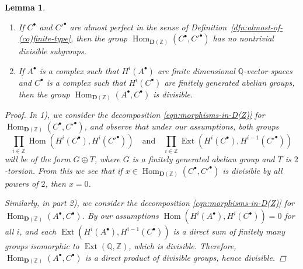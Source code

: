 \documentclass[leqno,12pt]{article}
\theoremstyle{plain}
\newtheorem{lemma}[theorem]{\indent\sc Lemma}
\theoremstyle{definition}
\DeclareMathOperator{\Hom}{Hom}
\DeclareMathOperator{\Ext}{Ext}
\newcommand{\QQ}{\mathbb{Q}}
\newcommand{\ZZ}{\mathbb{Z}}
\newcommand{\DZ}{{\mathbf{D} (\ZZ)}}
\begin{document}
\begin{lemma}
  \label{lemma:morphisms-inDAb-not-divisible}
  ~

  \begin{enumerate}
  \item[$1)$] If $C^\bullet$ and $C'^\bullet$ are almost perfect in the sense of
    Definition~{\rm\ref{dfn:almost-of-(co)finite-type}}, then the group
    $\Hom_\DZ (C^\bullet, C'^\bullet)$ has no nontrivial
    divisible subgroups.

  \item[$2)$] If $A^\bullet$ is a complex such that $H^i (A^\bullet)$ are finite
    dimensional $\QQ$-vector spaces and $C^\bullet$ is a complex such that
    $H^i (C^\bullet)$ are finitely generated abelian groups, then the group
    $\Hom_\DZ (A^\bullet, C^\bullet)$ is divisible.
  \end{enumerate}

  \begin{proof}
    In 1), we consider the decomposition \eqref{eqn:morphisms-in-D(Z)} for
    $\Hom_\DZ (C^\bullet, C'^\bullet)$, and observe that under
    our assumptions, both groups
    \[ \prod_{i\in\ZZ} \Hom (H^i (C^\bullet), H^i (C'^\bullet))
      \quad\text{and}\quad
      \prod_{i\in\ZZ} \Ext (H^i (C^\bullet), H^{i-1} (C'^\bullet))\]
    will be of the form $G \oplus T$, where $G$ is a finitely generated abelian
    group and $T$ is $2$-torsion. From this we see that if
    $x \in \Hom_\DZ (C^\bullet, C'^\bullet)$ is divisible by all
    powers of $2$, then $x = 0$.

    Similarly, in part 2), we consider the decomposition
    \eqref{eqn:morphisms-in-D(Z)} for
    $\Hom_\DZ (A^\bullet, C^\bullet)$. By our assumptions
    $\Hom (H^i (A^\bullet), H^i (C^\bullet)) = 0$ for all $i$, and each
    $\Ext (H^i (A^\bullet), H^{i-1} (C^\bullet))$ is a direct sum of
    finitely many groups isomorphic to $\Ext (\QQ,\ZZ)$, which is
    divisible. Therefore, $\Hom_\DZ (A^\bullet, C^\bullet)$ is
    a direct product of divisible groups, hence divisible.
  \end{proof}
\end{lemma}
\end{document}
